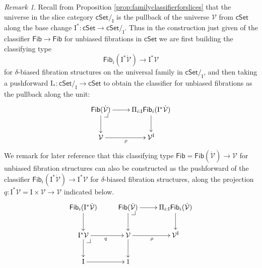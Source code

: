 \documentclass[12pt]{article}
\makeatletter
\newcommand{\cSet}{\ensuremath{\mathsf{cSet}}}
\newcommand{\ra}{\ensuremath{\rightarrow}}
\newcommand{\fib}{\ensuremath{\twoheadrightarrow}}
\renewcommand{\to}{\ensuremath{\rightarrow}}
\newcommand{\I}{\ensuremath{\mathrm{I}}}
\newcommand{\U}{\ensuremath{\mathcal{U}}}
\newcommand{\UU}{\ensuremath{\,\dot{\mathcal{U}}}}
\newcommand{\V}{\ensuremath{\mathcal{V}}}
\newcommand{\VV}{\ensuremath{\dot{\mathcal{V}}}}
\newcommand{\Fib}{\ensuremath{\mathsf{Fib}}}
\newcommand{\FFib}{\ensuremath{\dot{\mathsf{Fib}}}}
\newtheorem{lemma}[theorem]{Lemma}
\theoremstyle{remark}
\newtheorem{remark}[theorem]{Remark}
\theoremstyle{definition}
\newtheorem{definition}[theorem]{Definition}
\newcommand{\pbcorner}[1][dr]{\save*!/#1-1.2pc/#1:(-1,1)@^{|-}\restore}
\makeatother
\begin{document}

\begin{remark}\label{sliceuniversalfibrations}
Recall from Proposition \ref{prop:familyclassifierforslices} that the universe in the slice category $\cSet/_\I$ is the pullback of the universe $\V$ from $\cSet$ along the base change $\I^* : \cSet \to \cSet/_\I$.  Thus in the construction just given of the classifier $\FFib\ra\Fib$ for unbiased fibrations in $\cSet$  we are first building the classifying type $$\Fib_i(\I^*\VV) \to \I^*\V$$ for $\delta$-biased fibration structures on the universal family in $\cSet/_\I$, and then taking a pushforward $\I_*: \cSet/_\I \to \cSet$ to obtain the classifier for unbiased fibrations as the pullback along the unit:
\begin{equation}\label{diagram:fibUuniversal}
\xymatrix{
 \Fib(\VV) \ar[d] \ar[r] \pbcorner & \ar[d] \Pi_{i:\I}\Fib_i(\I^*\VV) \\
 \V \ar[r]_{\rho} &  \V^\I
}
\end{equation}
We remark for later reference that this classifying type $\Fib = \Fib(\VV) \to \V$ for unbiased fibration structures can also be constructed as the pushforward of the classifier $\Fib_i(\I^*\VV) \to \I^*\V$ for $\delta$-biased fibration structures, along the projection $q : \I^*\V =  \I\times \V \to \V$ indicated below.
\begin{equation}\label{diagram:fibUuniversal2}
\xymatrix{
 \Fib_i(\I^*\VV) \ar[d] &  \Fib(\VV) \ar[d] \ar[r] \pbcorner & \ar[d] \Pi_{i:\I}\Fib_i(\VV) \\
 \I^*\V \ar[r]_q \ar[d] \pbcorner & \V \ar[r]_{\rho} \ar[d] &  \V^\I\\
 \I \ar[r] & 1
}
\end{equation}
\end{remark}


\end{document}
